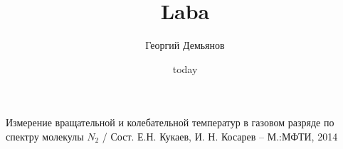 \documentclass[a4paper,12pt]{article}
\title{Laba}
\author{Георгий Демьянов}
\date{today}
\begin{document}

\tableofcontents
\clearpage





\begin{thebibliography}{1}
	Измерение вращательной и колебательной температур в газовом разряде по спектру молекулы $N_2$ / Сост. Е.Н. Кукаев, И. Н. Косарев -- М.:МФТИ, 2014
\end{thebibliography}

\begin{comment}
\begin{thebibliography}{1}
\bibitem{1}
ЯМР-релаксаця : учебно-методическое пособие / сост.: А.
М. Перепухов, А.В. Максимычев, О.В. Кишенков, А.Ю. Куксин –
М.: МФТИ, 2015.
\end{thebibliography}
\end{comment}



%
%
\end{document}
